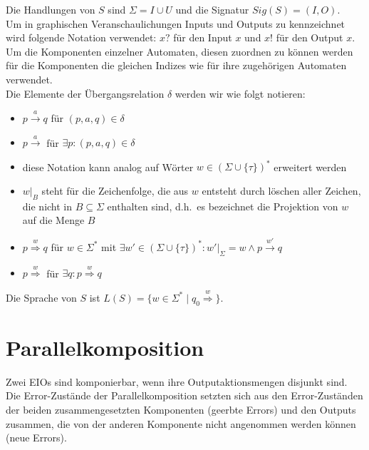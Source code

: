 Die Handlungen von $S$ sind $\Sigma = I\cup U$ und die Signatur
$Sig(S)=(I,O)$.\\
Um in graphischen Veranschaulichungen Inputs und Outputs zu kennzeichnet wird
folgende Notation verwendet: $x?$ für den Input $x$ und $x!$ für den Output
$x$.\\
Um die Komponenten einzelner Automaten, diesen zuordnen zu können werden für
die Komponenten die gleichen Indizes wie für ihre zugehörigen Automaten
verwendet.\\
Die Elemente der Übergangsrelation $\delta$ werden wir wie folgt notieren:
\begin{itemize}
  \item $p\overset{a}{\rightarrow} q$ für $(p,a,q)\in\delta$
  \item $p\overset{a}{\rightarrow}$ für $\exists p: (p,a,q)\in\delta$
  \item diese Notation kann analog auf Wörter $w\in(\Sigma\cup\{\tau\})^*$
    erweitert werden
  \item $w|_B$ steht für die Zeichenfolge, die aus $w$ entsteht durch löschen
    aller Zeichen, die nicht in $B\subseteq\Sigma$ enthalten sind, d.h.\ es
    bezeichnet die Projektion von $w$ auf die Menge $B$
  \item $p\overset{w}{\Rightarrow} q$ für $w\in\Sigma^*$ mit $\exists
    w'\in(\Sigma\cup\{\tau\})^*:w'|_{\Sigma}=w\wedge p\overset{w'}{\rightarrow}
    q$
  \item $p\overset{w}{\Rightarrow}$ für $\exists q:p\overset{w}{\Rightarrow} q$
\end{itemize}
Die Sprache von $S$ ist
$L(S)=\{w\in\Sigma^*\mid q_0\overset{w}{\Rightarrow}\}$.

\section{Parallelkomposition}
Zwei EIOs sind komponierbar, wenn ihre Outputaktionsmengen disjunkt sind. Die
Error-Zustände der Parallelkomposition setzten sich aus den Error-Zuständen der
beiden zusammengesetzten Komponenten (geerbte Errors) und den Outputs zusammen, die von der
anderen Komponente nicht angenommen werden können (neue Errors).

